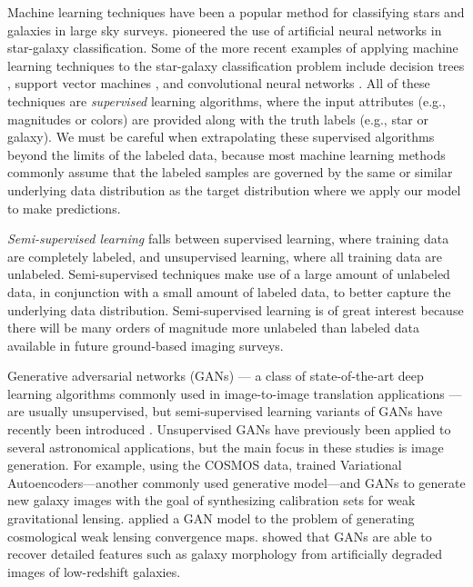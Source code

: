 \documentclass[fleqn,usenatbib]{mnras}
\newcommand{\eg}{{e.g., }}
\begin{document}
Machine learning techniques have been a popular method for classifying stars and galaxies in large sky surveys.
\citet{odewahn1992automated} pioneered the use of artificial neural networks in star-galaxy classification.
Some of the more recent examples of applying machine learning techniques to the star-galaxy classification problem include
decision trees \citep[\eg][]{ball2006robust},
support vector machines \citep[\eg][]{fadely2012},
and convolutional neural networks \citep{kim2017star}.
All of these techniques are \emph{supervised} learning algorithms,
where the input attributes (\eg magnitudes or colors) are provided along with the truth labels (\eg star or galaxy).
We must be careful when extrapolating these supervised algorithms beyond the limits of the labeled data,
because most machine learning methods commonly assume that the labeled samples are governed by
the same or similar underlying data distribution as the target distribution where we apply our model to make predictions.

\emph{Semi-supervised learning} falls between supervised learning, where training data are completely labeled,
and unsupervised learning, where all training data are unlabeled.
Semi-supervised techniques make use of a large amount of unlabeled data, in conjunction with a small amount of labeled data,
to better capture the underlying data distribution.
Semi-supervised learning is of great interest because there will be many orders of magnitude
more unlabeled than labeled data available in future ground-based imaging surveys.

Generative adversarial networks (GANs) --- a class of state-of-the-art deep learning algorithms commonly used in
image-to-image translation applications --- are usually unsupervised,
but semi-supervised learning variants of GANs have recently been introduced
\citep{springenberg2016unsupervised,salimans2016improved,odena2016semi}.
Unsupervised GANs have previously been applied to several astronomical applications,
but the main focus in these studies is image generation.
For example, using the COSMOS data, \citet{ravanbakhsh2017enabling} trained
Variational Autoencoders---another commonly used generative model---and GANs
to generate new galaxy images with the goal of synthesizing calibration sets for weak gravitational lensing.
\citet{mustafa2017creating} applied a GAN model to the problem of generating cosmological weak lensing convergence maps.
\citet{schawinski2017generative} showed that GANs are able to recover detailed features such as galaxy morphology
from artificially degraded images of low-redshift galaxies.
\end{document}
